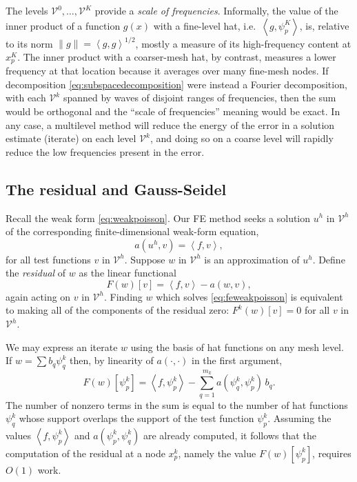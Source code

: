 \documentclass[letterpaper,final,12pt,reqno]{amsart}
\newcommand{\ip}[2]{\left<#1,#2\right>}
\numberwithin{equation}{section}
\numberwithin{figure}{section}
\numberwithin{table}{section}
\begin{document}
The levels $\mathcal{V}^0,\dots,\mathcal{V}^{K}$ provide a \emph{scale of frequencies}.  Informally, the value of the inner product of a function $g(x)$ with a fine-level hat, i.e.~$\ip{g}{\psi_p^K}$, is, relative to its norm $\|g\| = \ip{g}{g}^{1/2}$, mostly a measure of its high-frequency content at $x_p^K$.  The inner product with a coarser-mesh hat, by contrast, measures a lower frequency at that location because it averages over many fine-mesh nodes.  If decomposition \eqref{eq:subspacedecomposition} were instead a Fourier decomposition, with each $\mathcal{V}^k$ spanned by waves of disjoint ranges of frequencies, then the sum would be orthogonal and the ``scale of frequencies'' meaning would be exact.  In any case, a multilevel method will reduce the energy of the error in a solution estimate (iterate) on each level $\mathcal{V}^k$, and doing so on a coarse level will rapidly reduce the low frequencies present in the error.

\subsection*{The residual and Gauss-Seidel}  Recall the weak form \eqref{eq:weakpoisson}.  Our FE method seeks a solution $u^h$ in $\mathcal{V}^h$ of the corresponding finite-dimensional weak-form equation,
\begin{equation}
  a(u^h,v) = \ip{f}{v},  \label{eq:feweakpoisson}
\end{equation}
for all test functions $v$ in $\mathcal{V}^h$.  Suppose $w$ in $\mathcal{V}^h$ is an approximation of $u^h$.  Define the \emph{residual} of $w$ as the linear functional
\begin{equation}
  F(w)[v] = \ip{f}{v} - a(w,v),  \label{eq:residual}
\end{equation}
again acting on $v$ in $\mathcal{V}^h$.  Finding $w$ which solves \eqref{eq:feweakpoisson} is equivalent to making all of the components of the residual zero: $F^k(w)[v]=0$ for all $v$ in $\mathcal{V}^h$.

We may express an iterate $w$ using the basis of hat functions on any mesh level.  If $w = \sum b_q \psi_q^k$ then, by linearity of $a(\cdot,\cdot)$ in the first argument,
\begin{equation}
  F(w)[\psi_p^k] = \ip{f}{\psi_p^k} - \sum_{q=1}^{m_k} a(\psi_q^k,\psi_p^k) \,b_q.  \label{eq:residualpoisson}
\end{equation}
The number of nonzero terms in the sum is equal to the number of hat functions $\psi_q^k$ whose support overlaps the support of the test function $\psi_p^k$.  Assuming the values $\ip{f}{\psi_p^k}$ and $a(\psi_p^k,\psi_q^k)$ are already computed, it follows that the computation of the residual at a node $x_p^k$, namely the value $F(w)[\psi_p^k]$, requires $O(1)$ work.
\end{document}
